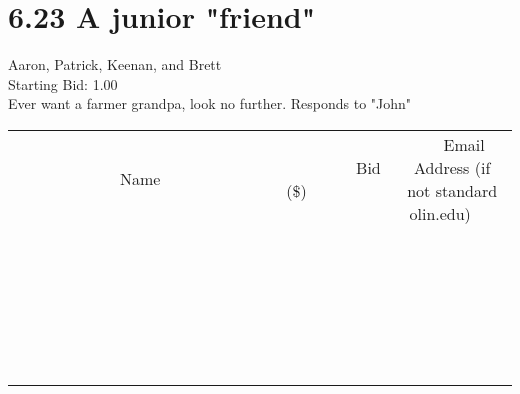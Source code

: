 \documentclass[11pt]{article}
\begin{document}
					\section*{6.23 A junior "friend"}
					Aaron, Patrick, Keenan, and Brett \\
					Starting Bid: 1.00 \\
					Ever want a farmer grandpa, look no further. Responds to "John" \\
					[6ex]
					\begin{tabular}{c c c}
						~~~~~~~~~~~~~Name~~~~~~~~~~~~~ & ~~~~~~~~~Bid (\$)~~~~~~~~~ & ~~~Email Address (if not standard olin.edu)~~~ \\
				
 & & \\
\hline
 & & \\
\hline
 & & \\
\hline
 & & \\
\hline
 & & \\
\hline
 & & \\
\hline
 & & \\
\hline
 & & \\
\hline
 & & \\
\hline
 & & \\
\hline
 & & \\
\hline
 & & \\
\hline
 & & \\
\hline
 & & \\
\hline
 & & \\
\hline
 & & \\
\hline
 & & \\
\hline
 & & \\
\hline
 & & \\
\hline
 & & \\
\hline
 & & \\
\hline
 & & \\
\hline
 & & \\
\hline
 & & \\
\hline
 & & \\
\hline
 & & \\
\hline
					\end{tabular}
					\clearpage
				
\end{document}
